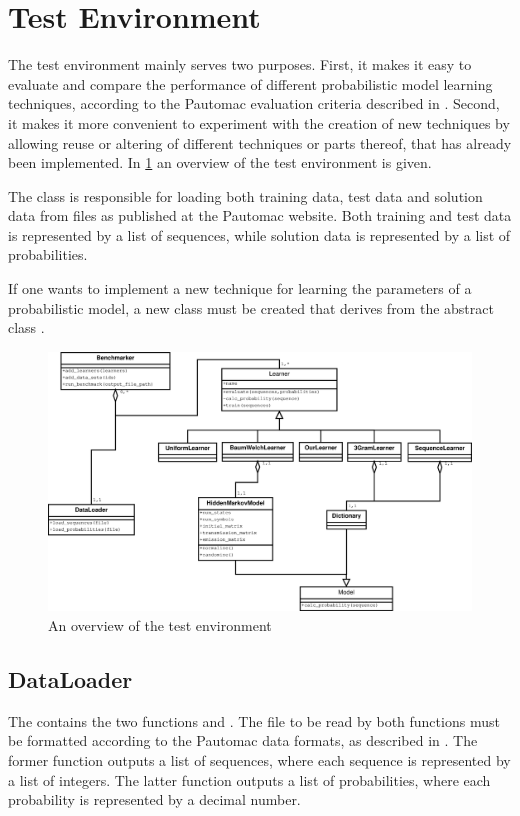 \section{Test Environment}

The test environment mainly serves two purposes. First, it makes it easy to evaluate and compare the performance of different probabilistic model learning techniques, according to the Pautomac evaluation criteria described in .
Second, it makes it more convenient to experiment with the creation of new techniques by allowing reuse or altering of different techniques or parts thereof, that has already been implemented. In \ref{fig:testenvironment} an overview of the test environment is given.

The  class is responsible for loading both training data, test data and solution data from files as published at the Pautomac website. Both training and test data is represented by a list of sequences, while solution data is represented by a list of probabilities.

If one wants to implement a new technique for learning the parameters of a probabilistic model, a new class must be created that derives from the abstract class . 

\begin{figure}[!htb]
\centering
\includegraphics[scale=.4]{pictures/test-environment-overview.eps}
\caption{An overview of the test environment}
\label{fig:testenvironment}
\end{figure}

\subsection{DataLoader}
The  contains the two functions  and . The file to be read by both functions must be formatted according to the Pautomac data formats, as described in . The former function outputs a list of sequences, where each sequence is represented by a list of integers.
The latter function outputs a list of probabilities, where each probability is represented by a decimal number.

